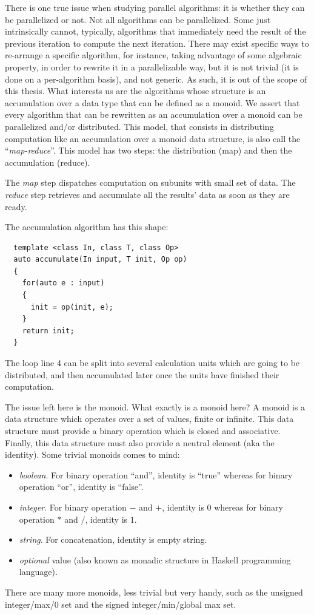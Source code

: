 There is one true issue when studying parallel algorithms: it is whether they can be parallelized or not. Not all
algorithms can be parallelized. Some just intrinsically cannot, typically, algorithms that immediately need the result
of the previous iteration to compute the next iteration. There may exist specific ways to re-arrange a specific
algorithm, for instance, taking advantage of some algebraic property, in order to rewrite it in a parallelizable way,
but it is not trivial (it is done on a per-algorithm basis), and not generic. As such, it is out of the scope of this
thesis. What interests us are the algorithms whose structure is an accumulation over a data type that can be defined as
a monoid. We assert that every algorithm that can be rewritten as an accumulation over a monoid can be parallelized
and/or distributed. This model, that consists in distributing computation like an accumulation over a monoid data
structure, is also call the ``\emph{map-reduce}''. This model has two steps: the distribution (map) and then the
accumulation (reduce).

The \emph{map} step dispatches computation on subunits with small set of data. The \emph{reduce} step retrieves and
accumulate all the results' data as soon as they are ready.

The accumulation algorithm has this shape:
\begin{verbatim}
  template <class In, class T, class Op>
  auto accumulate(In input, T init, Op op)
  {
    for(auto e : input)
    {
      init = op(init, e);
    }
    return init;
  }
\end{verbatim}

The loop line 4 can be split into several calculation units which are going to be distributed, and then accumulated
later once the units have finished their computation.

The issue left here is the monoid. What exactly is a monoid here? A monoid is a data structure which operates over a set
of values, finite or infinite. This data structure must provide a binary operation which is closed and associative.
Finally, this data structure must also provide a neutral element (aka the identity). Some trivial monoids comes to mind:
\begin{itemize}
  \item \emph{boolean}. For binary operation ``and'', identity is ``true'' whereas for binary operation ``or'', identity
        is ``false''.
  \item \emph{integer}. For binary operation \(-\) and \(+\), identity is \(0\) whereas for binary operation \(*\) and
        \(/\), identity is \(1\).
  \item \emph{string}. For concatenation, identity is empty string.
  \item \emph{optional} value (also known as monadic structure in Haskell programming language).
\end{itemize}
There are many more monoids, less trivial but very handy, such as the unsigned integer/max/0 set and the signed
integer/min/global max set.

